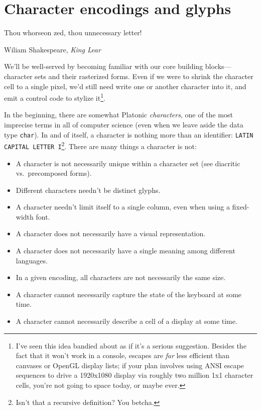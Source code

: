 \documentclass[letterpaper,10pt]{article}
\newenvironment{denseitemize}{
  \begin{itemize}
      \setlength{\itemsep}{0pt}
}{
  \end{itemize}
}
\begin{document}
\newpage


\pagebreak
\newpage

\pagebreak
\newpage

\section{Character encodings and glyphs}\label{section:unicode}
\label{sec:charsets}
\epigraph{Thou whorseon zed, thou unnecessary letter!}{Wiliam Shakespeare, \textit{King Lear}}
We'll be well-served by becoming familiar with our core building
blocks---character sets and their rasterized forms. Even if we were to shrink
the character cell to a single pixel, we'd still need write one or another
character into it, and emit a control code to stylize it\footnote{I've seen
this idea bandied about as if it's a serious suggestion. Besides the fact
that it won't work in a console, escapes are \textit{far} less efficient than
canvases or OpenGL display lists; if your plan involves using ANSI escape
sequences to drive a 1920x1080 display via roughly two million 1x1 character
cells, you're not going to space today, or maybe ever\cite{upgoerfive}.}.

In the beginning, there are somewhat Platonic \textit{characters}, one of the
most imprecise terms in all of computer science (even when we leave aside the
data type \texttt{char}). In and of itself, a character is nothing more than an
identifier: \texttt{LATIN CAPITAL LETTER I}\footnote{Isn't that a recursive
definition? You betcha.}. There are many things a character is not:

\begin{denseitemize}
\item{A character is not necessarily unique within a character set (see diacritic vs.\ precomposed forms).}
\item{Different characters needn't be distinct glyphs\cite{nothinggoesaway}.}
\item{A character needn't limit itself to a single column, even when using a fixed-width font.}
\item{A character does not necessarily have a visual representation.}
\item{A character does not necessarily have a single meaning among different languages.}
\item{In a given encoding, all characters are not necessarily the same size.}
\item{A character cannot necessarily capture the state of the keyboard at some time.}
\item{A character cannot necessarily describe a cell of a display at some time.}
\end{denseitemize}
\end{document}

